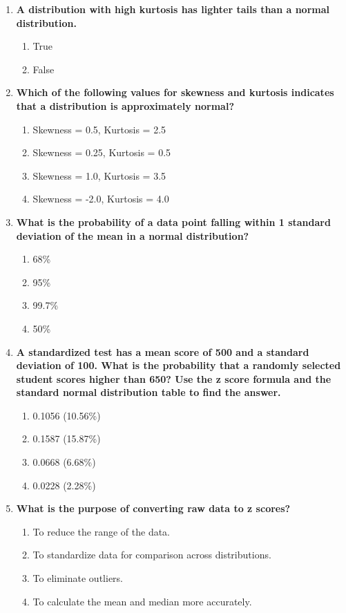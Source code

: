 \documentclass[
  letterpaper,
  DIV=11,
  numbers=noendperiod]{scrreprt}
\begin{document}
\begin{enumerate}
\def\labelenumi{\arabic{enumi}.}
\item
  \textbf{A distribution with high kurtosis has lighter tails than a
  normal distribution.}

  \begin{enumerate}
  \def\labelenumii{\alph{enumii}.}
  \item
    True
  \item
    False
  \end{enumerate}
\item
  \textbf{Which of the following values for skewness and kurtosis
  indicates that a distribution is approximately normal?}

  \begin{enumerate}
  \def\labelenumii{\alph{enumii}.}
  \item
    Skewness = 0.5, Kurtosis = 2.5
  \item
    Skewness = 0.25, Kurtosis = 0.5
  \item
    Skewness = 1.0, Kurtosis = 3.5
  \item
    Skewness = -2.0, Kurtosis = 4.0
  \end{enumerate}
\item
  \textbf{What is the probability of a data point falling within 1
  standard deviation of the mean in a normal distribution?}

  \begin{enumerate}
  \def\labelenumii{\alph{enumii}.}
  \item
    68\%
  \item
    95\%
  \item
    99.7\%
  \item
    50\%
  \end{enumerate}
\item
  \textbf{A standardized test has a mean score of 500 and a standard
  deviation of 100. What is the probability that a randomly selected
  student scores higher than 650? Use the z score formula and the
  standard normal distribution table to find the answer.}

  \begin{enumerate}
  \def\labelenumii{\alph{enumii}.}
  \item
    0.1056 (10.56\%)
  \item
    0.1587 (15.87\%)
  \item
    0.0668 (6.68\%)
  \item
    0.0228 (2.28\%)
  \end{enumerate}
\item
  \textbf{What is the purpose of converting raw data to z scores?}

  \begin{enumerate}
  \def\labelenumii{\alph{enumii}.}
  \item
    To reduce the range of the data.
  \item
    To standardize data for comparison across distributions.
  \item
    To eliminate outliers.
  \item
    To calculate the mean and median more accurately.
  \end{enumerate}
\end{enumerate}
\end{document}
